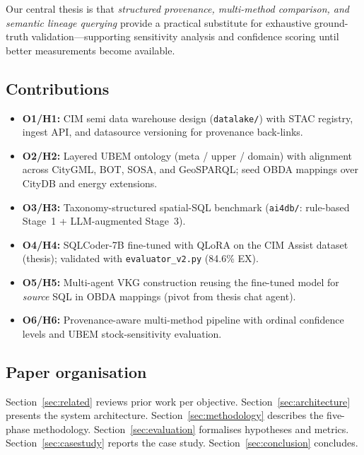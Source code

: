 Our central thesis is that \emph{structured provenance, multi-method comparison, and semantic lineage querying} provide a practical substitute for exhaustive ground-truth validation---supporting sensitivity analysis and confidence scoring until better measurements become available.

\subsection{Contributions}

\begin{itemize}[leftmargin=*]
  \item \textbf{O1/H1:} CIM semi data warehouse design (\texttt{datalake/}) with STAC registry, ingest API, and datasource versioning for provenance back-links.
  \item \textbf{O2/H2:} Layered UBEM ontology (meta / upper / domain) with alignment across CityGML, BOT, SOSA, and GeoSPARQL; seed OBDA mappings over CityDB and energy extensions.
  \item \textbf{O3/H3:} Taxonomy-structured spatial-SQL benchmark (\texttt{ai4db/}: rule-based Stage~1 + LLM-augmented Stage~3).
  \item \textbf{O4/H4:} SQLCoder-7B fine-tuned with QLoRA on the CIM Assist dataset (thesis); validated with \texttt{evaluator\_v2.py} (84.6\% EX).
  \item \textbf{O5/H5:} Multi-agent VKG construction reusing the fine-tuned model for \emph{source} SQL in OBDA mappings (pivot from thesis chat agent).
  \item \textbf{O6/H6:} Provenance-aware multi-method pipeline with ordinal confidence levels and UBEM stock-sensitivity evaluation.
\end{itemize}

\subsection{Paper organisation}

Section~\ref{sec:related} reviews prior work per objective.
Section~\ref{sec:architecture} presents the system architecture.
Section~\ref{sec:methodology} describes the five-phase methodology.
Section~\ref{sec:evaluation} formalises hypotheses and metrics.
Section~\ref{sec:casestudy} reports the case study.
Section~\ref{sec:conclusion} concludes.
